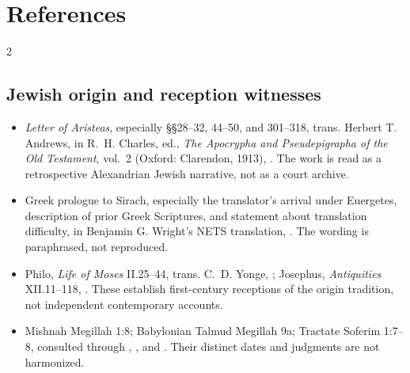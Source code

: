 \section{References}

\begingroup
\setlength{\parskip}{0.15em}
\titlespacing*{\subsection}{0pt}{1.35ex}{0.45ex}
\begin{multicols}{2}
\raggedcolumns

\subsection*{Jewish origin and reception witnesses}

{\footnotesize
\begin{itemize}[itemsep=0.1em,topsep=0.15em]
\item \emph{Letter of Aristeas}, especially \S\S28--32, 44--50, and 301--318, trans. Herbert T. Andrews, in R.~H. Charles, ed., \emph{The Apocrypha and Pseudepigrapha of the Old Testament}, vol.~2 (Oxford: Clarendon, 1913), . The work is read as a retrospective Alexandrian Jewish narrative, not as a court archive.
\item Greek prologue to Sirach, especially the translator's arrival under Euergetes, description of prior Greek Scriptures, and statement about translation difficulty, in Benjamin G. Wright's NETS translation, . The wording is paraphrased, not reproduced.
\item Philo, \emph{Life of Moses} II.25--44, trans. C.~D. Yonge, ; Josephus, \emph{Antiquities} XII.11--118, . These establish first-century receptions of the origin tradition, not independent contemporary accounts.
\item Mishnah Megillah 1:8; Babylonian Talmud Megillah 9a; Tractate Soferim 1:7--8, consulted through , , and . Their distinct dates and judgments are not harmonized.
\end{itemize}}


\end{multicols}
